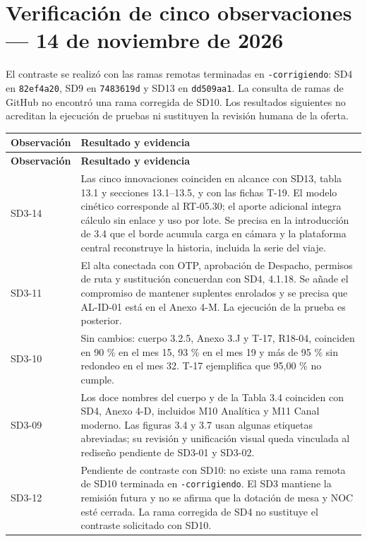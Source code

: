 \documentclass[11pt,letterpaper]{article}
\begin{document}
\section*{Verificación de cinco observaciones — 14 de noviembre de 2026}

El contraste se realizó con las ramas remotas terminadas en \texttt{-corrigiendo}: SD4 en \texttt{82ef4a20}, SD9 en \texttt{7483619d} y SD13 en \texttt{dd509aa1}. La consulta de ramas de GitHub no encontró una rama corregida de SD10. Los resultados siguientes no acreditan la ejecución de pruebas ni sustituyen la revisión humana de la oferta.

\begin{longtable}{@{}P{0.17\textwidth}P{\tabcolsep\relax}@{}}
\hline
\textbf{Observación} & \textbf{Resultado y evidencia} \\
\hline
\endfirsthead
\hline
\textbf{Observación} & \textbf{Resultado y evidencia} \\
\hline
\endhead
\hline
\endfoot
SD3-14 & Las cinco innovaciones coinciden en alcance con SD13, tabla 13.1 y secciones 13.1--13.5, y con las fichas T-19. El modelo cinético corresponde al RT-05.30; el aporte adicional integra cálculo sin enlace y uso por lote. Se precisa en la introducción de 3.4 que el borde acumula carga en cámara y la plataforma central reconstruye la historia, incluida la serie del viaje. \\
SD3-11 & El alta conectada con OTP, aprobación de Despacho, permisos de ruta y sustitución concuerdan con SD4, 4.1.18. Se añade el compromiso de mantener suplentes enrolados y se precisa que AL-ID-01 está en el Anexo 4-M. La ejecución de la prueba es posterior. \\
SD3-10 & Sin cambios: cuerpo 3.2.5, Anexo 3.J y T-17, R18-04, coinciden en 90 \% en el mes 15, 93 \% en el mes 19 y más de 95 \% sin redondeo en el mes 32. T-17 ejemplifica que 95,00 \% no cumple. \\
SD3-09 & Los doce nombres del cuerpo y de la Tabla 3.4 coinciden con SD4, Anexo 4-D, incluidos M10 Analítica y M11 Canal moderno. Las figuras 3.4 y 3.7 usan algunas etiquetas abreviadas; su revisión y unificación visual queda vinculada al rediseño pendiente de SD3-01 y SD3-02. \\
SD3-12 & Pendiente de contraste con SD10: no existe una rama remota de SD10 terminada en \texttt{-corrigiendo}. El SD3 mantiene la remisión futura y no se afirma que la dotación de mesa y NOC esté cerrada. La rama corregida de SD4 no sustituye el contraste solicitado con SD10. \\
\end{longtable}
\end{document}
